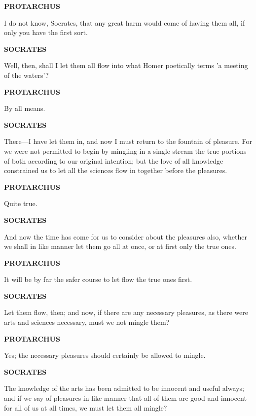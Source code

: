 \documentclass[11pt,letter]{article}
\begin{document}
\par \textbf{PROTARCHUS}
\par   I do not know, Socrates, that any great harm would come of having them all, if only you have the first sort.

\par \textbf{SOCRATES}
\par   Well, then, shall I let them all flow into what Homer poetically terms 'a meeting of the waters'?

\par \textbf{PROTARCHUS}
\par   By all means.

\par \textbf{SOCRATES}
\par   There—I have let them in, and now I must return to the fountain of pleasure. For we were not permitted to begin by mingling in a single stream the true portions of both according to our original intention; but the love of all knowledge constrained us to let all the sciences flow in together before the pleasures.

\par \textbf{PROTARCHUS}
\par   Quite true.

\par \textbf{SOCRATES}
\par   And now the time has come for us to consider about the pleasures also, whether we shall in like manner let them go all at once, or at first only the true ones.

\par \textbf{PROTARCHUS}
\par   It will be by far the safer course to let flow the true ones first.

\par \textbf{SOCRATES}
\par   Let them flow, then; and now, if there are any necessary pleasures, as there were arts and sciences necessary, must we not mingle them?

\par \textbf{PROTARCHUS}
\par   Yes; the necessary pleasures should certainly be allowed to mingle.

\par \textbf{SOCRATES}
\par   The knowledge of the arts has been admitted to be innocent and useful always; and if we say of pleasures in like manner that all of them are good and innocent for all of us at all times, we must let them all mingle?
\end{document}
